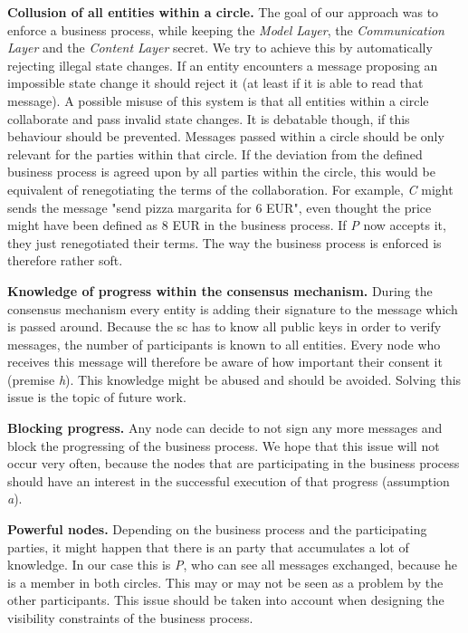 \documentclass[runningheads]{llncs}
\newcommand{\ber}[1]{\textit{#1}}
\renewcommand{\bigbreak}{}
\begin{document}
\bigbreak
\textbf{Collusion of all entities within a circle.} The goal of our approach was to enforce a business process, while keeping the \ber{Model Layer}, the \ber{Communication Layer} and the \ber{Content Layer} secret. We try to achieve this by automatically rejecting illegal state changes. If an entity encounters a message proposing an impossible state change it should reject it (at least if it is able to read that message). A possible misuse of this system is that all entities within a circle collaborate and pass invalid state changes. It is debatable though, if this behaviour should be prevented. Messages passed within a circle should be only relevant for the parties within that circle. If the deviation from the defined business process is agreed upon by all parties within the circle, this would be equivalent of renegotiating the terms of the collaboration. For example, \ber{C} might sends the message "send pizza margarita for 6 EUR", even thought the price might have been defined as 8 EUR in the business process. If \ber{P} now accepts it, they just renegotiated their terms. The way the business process is enforced is therefore rather soft. 


\bigbreak
\textbf{Knowledge of progress within the consensus mechanism.} During the consensus mechanism every entity is adding their signature to the message which is passed around. Because the sc has to know all public keys in order to verify messages, the number of participants is known to all entities. Every node who receives this message will therefore be aware of how important their consent it (premise \ber{h}). This knowledge might be abused and should be avoided. Solving this issue is the topic of future work.


\bigbreak
\textbf{Blocking progress.} Any node can decide to not sign any more messages and block the progressing of the business process. We hope that this issue will not occur very often, because the nodes that are participating in the business process should have an interest in the successful execution of that progress (assumption \ber{a}).


\bigbreak
\textbf{Powerful nodes.} Depending on the business process and the participating parties, it might happen that there is an party that accumulates a lot of knowledge. In our case this is \ber{P}, who can see all messages exchanged, because he is a member in both circles. This may or may not be seen as a problem by the other participants. This issue should be taken into account when designing the visibility constraints of the business process. 
\end{document}

